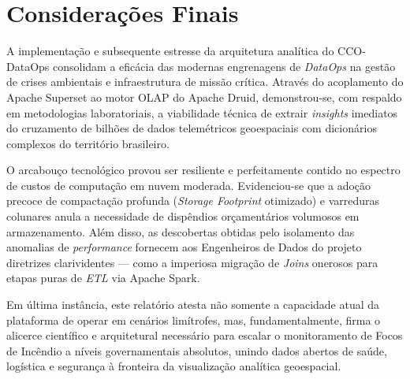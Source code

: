 \section{Considerações Finais}

A implementação e subsequente estresse da arquitetura analítica do CCO-DataOps consolidam a eficácia das modernas engrenagens de \textit{DataOps} na gestão de crises ambientais e infraestrutura de missão crítica. Através do acoplamento do Apache Superset ao motor OLAP do Apache Druid, demonstrou-se, com respaldo em metodologias laboratoriais, a viabilidade técnica de extrair \textit{insights} imediatos do cruzamento de bilhões de dados telemétricos geoespaciais com dicionários complexos do território brasileiro.

O arcabouço tecnológico provou ser resiliente e perfeitamente contido no espectro de custos de computação em nuvem moderada. Evidenciou-se que a adoção precoce de compactação profunda (\textit{Storage Footprint} otimizado) e varreduras colunares anula a necessidade de dispêndios orçamentários volumosos em armazenamento. Além disso, as descobertas obtidas pelo isolamento das anomalias de \textit{performance} fornecem aos Engenheiros de Dados do projeto diretrizes clarividentes --- como a imperiosa migração de \textit{Joins} onerosos para etapas puras de \textit{ETL} via Apache Spark.

Em última instância, este relatório atesta não somente a capacidade atual da plataforma de operar em cenários limítrofes, mas, fundamentalmente, firma o alicerce científico e arquitetural necessário para escalar o monitoramento de Focos de Incêndio a níveis governamentais absolutos, unindo dados abertos de saúde, logística e segurança à fronteira da visualização analítica geoespacial.
